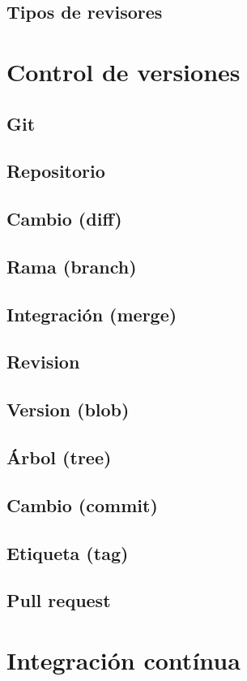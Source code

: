 \subsection{Tipos de revisores}
\section{Control de versiones}
\subsection{Git}
\subsection{Repositorio}
\subsection{Cambio (diff)}
\subsection{Rama (branch)}
\subsection{Integración (merge)}
\subsection{Revision}
\subsection{Version (blob)}
\subsection{Árbol (tree)}
\subsection{Cambio (commit)}
\subsection{Etiqueta (tag)}
\subsection{Pull request}
\section{Integración contínua}
